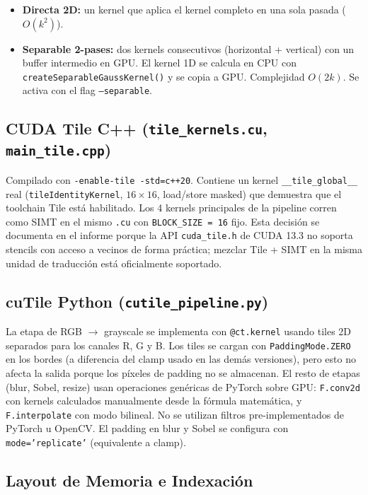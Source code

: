 \documentclass[12pt,a4paper]{article}
\begin{document}
\begin{itemize}
  \item \textbf{Directa 2D:} un kernel que aplica el kernel completo en una sola pasada ($O(k^2)$).
  \item \textbf{Separable 2-pases:} dos kernels consecutivos (horizontal + vertical) con un buffer intermedio en GPU. El kernel 1D se calcula en CPU con \texttt{createSeparableGaussKernel()} y se copia a GPU. Complejidad $O(2k)$. Se activa con el flag \texttt{--separable}.
\end{itemize}

\subsection{CUDA Tile C++ (\texttt{tile\_kernels.cu}, \texttt{main\_tile.cpp})}

Compilado con \texttt{-enable-tile -std=c++20}. Contiene un kernel \texttt{\_\_tile\_global\_\_} real (\texttt{tileIdentityKernel}, $16\times16$, load/store masked) que demuestra que el toolchain Tile est\'a habilitado. Los 4 kernels principales de la pipeline corren como SIMT en el mismo \texttt{.cu} con \texttt{BLOCK\_SIZE = 16} fijo. Esta decisi\'on se documenta en el informe porque la API \texttt{cuda\_tile.h} de CUDA 13.3 no soporta stencils con acceso a vecinos de forma pr\'actica; mezclar Tile + SIMT en la misma unidad de traducci\'on est\'a oficialmente soportado.

\subsection{cuTile Python (\texttt{cutile\_pipeline.py})}

La etapa de RGB $\rightarrow$ grayscale se implementa con \texttt{@ct.kernel} usando tiles 2D separados para los canales R, G y B. Los tiles se cargan con \texttt{PaddingMode.ZERO} en los bordes (a diferencia del clamp usado en las dem\'as versiones), pero esto no afecta la salida porque los p\'ixeles de padding no se almacenan. El resto de etapas (blur, Sobel, resize) usan operaciones gen\'ericas de PyTorch sobre GPU: \texttt{F.conv2d} con kernels calculados manualmente desde la f\'ormula matem\'atica, y \texttt{F.interpolate} con modo bilineal. No se utilizan filtros pre-implementados de PyTorch u OpenCV. El padding en blur y Sobel se configura con \texttt{mode='replicate'} (equivalente a clamp).

\subsection{Layout de Memoria e Indexaci\'on}
\end{document}
